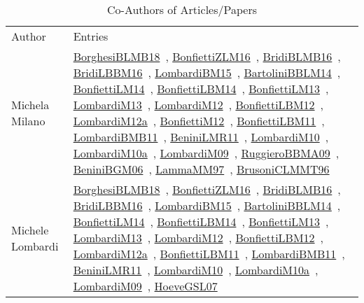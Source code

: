 {\scriptsize
\begin{longtable}{p{4cm}p{20cm}}
\rowcolor{white}\caption{Co-Authors of Articles/Papers}\\ \toprule
\rowcolor{white}Author & Entries \\ \midrule\endhead
\bottomrule
\endfoot
Michela Milano & \href{works/BorghesiBLMB18.pdf}{BorghesiBLMB18}~\cite{BorghesiBLMB18}, \href{works/BonfiettiZLM16.pdf}{BonfiettiZLM16}~\cite{BonfiettiZLM16}, \href{works/BridiBLMB16.pdf}{BridiBLMB16}~\cite{BridiBLMB16}, \href{works/BridiLBBM16.pdf}{BridiLBBM16}~\cite{BridiLBBM16}, \href{works/LombardiBM15.pdf}{LombardiBM15}~\cite{LombardiBM15}, \href{works/BartoliniBBLM14.pdf}{BartoliniBBLM14}~\cite{BartoliniBBLM14}, \href{works/BonfiettiLM14.pdf}{BonfiettiLM14}~\cite{BonfiettiLM14}, \href{works/BonfiettiLBM14.pdf}{BonfiettiLBM14}~\cite{BonfiettiLBM14}, \href{works/BonfiettiLM13.pdf}{BonfiettiLM13}~\cite{BonfiettiLM13}, \href{works/LombardiM13.pdf}{LombardiM13}~\cite{LombardiM13}, \href{works/LombardiM12.pdf}{LombardiM12}~\cite{LombardiM12}, \href{works/BonfiettiLBM12.pdf}{BonfiettiLBM12}~\cite{BonfiettiLBM12}, \href{works/LombardiM12a.pdf}{LombardiM12a}~\cite{LombardiM12a}, \href{works/BonfiettiM12.pdf}{BonfiettiM12}~\cite{BonfiettiM12}, \href{works/BonfiettiLBM11.pdf}{BonfiettiLBM11}~\cite{BonfiettiLBM11}, \href{works/LombardiBMB11.pdf}{LombardiBMB11}~\cite{LombardiBMB11}, \href{works/BeniniLMR11.pdf}{BeniniLMR11}~\cite{BeniniLMR11}, \href{works/LombardiM10.pdf}{LombardiM10}~\cite{LombardiM10}, \href{works/LombardiM10a.pdf}{LombardiM10a}~\cite{LombardiM10a}, \href{works/LombardiM09.pdf}{LombardiM09}~\cite{LombardiM09}, \href{works/RuggieroBBMA09.pdf}{RuggieroBBMA09}~\cite{RuggieroBBMA09}, \href{works/BeniniBGM06.pdf}{BeniniBGM06}~\cite{BeniniBGM06}, \href{works/LammaMM97.pdf}{LammaMM97}~\cite{LammaMM97}, \href{works/BrusoniCLMMT96.pdf}{BrusoniCLMMT96}~\cite{BrusoniCLMMT96}\\
Michele Lombardi & \href{works/BorghesiBLMB18.pdf}{BorghesiBLMB18}~\cite{BorghesiBLMB18}, \href{works/BonfiettiZLM16.pdf}{BonfiettiZLM16}~\cite{BonfiettiZLM16}, \href{works/BridiBLMB16.pdf}{BridiBLMB16}~\cite{BridiBLMB16}, \href{works/BridiLBBM16.pdf}{BridiLBBM16}~\cite{BridiLBBM16}, \href{works/LombardiBM15.pdf}{LombardiBM15}~\cite{LombardiBM15}, \href{works/BartoliniBBLM14.pdf}{BartoliniBBLM14}~\cite{BartoliniBBLM14}, \href{works/BonfiettiLM14.pdf}{BonfiettiLM14}~\cite{BonfiettiLM14}, \href{works/BonfiettiLBM14.pdf}{BonfiettiLBM14}~\cite{BonfiettiLBM14}, \href{works/BonfiettiLM13.pdf}{BonfiettiLM13}~\cite{BonfiettiLM13}, \href{works/LombardiM13.pdf}{LombardiM13}~\cite{LombardiM13}, \href{works/LombardiM12.pdf}{LombardiM12}~\cite{LombardiM12}, \href{works/BonfiettiLBM12.pdf}{BonfiettiLBM12}~\cite{BonfiettiLBM12}, \href{works/LombardiM12a.pdf}{LombardiM12a}~\cite{LombardiM12a}, \href{works/BonfiettiLBM11.pdf}{BonfiettiLBM11}~\cite{BonfiettiLBM11}, \href{works/LombardiBMB11.pdf}{LombardiBMB11}~\cite{LombardiBMB11}, \href{works/BeniniLMR11.pdf}{BeniniLMR11}~\cite{BeniniLMR11}, \href{works/LombardiM10.pdf}{LombardiM10}~\cite{LombardiM10}, \href{works/LombardiM10a.pdf}{LombardiM10a}~\cite{LombardiM10a}, \href{works/LombardiM09.pdf}{LombardiM09}~\cite{LombardiM09}, \href{works/HoeveGSL07.pdf}{HoeveGSL07}~\cite{HoeveGSL07}\\

\end{longtable}}
